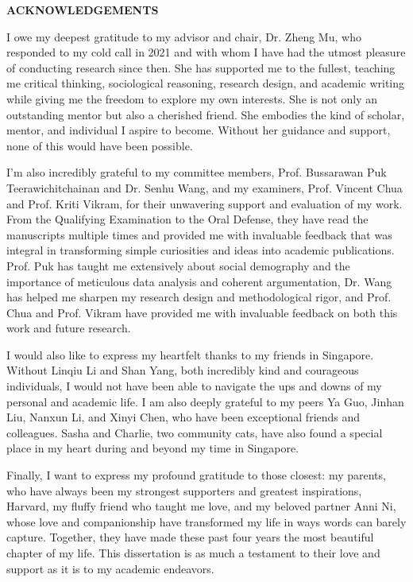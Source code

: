 \begin{center}
    {\large \textbf{ACKNOWLEDGEMENTS}}
\end{center}

\thispagestyle{plain}

I owe my deepest gratitude to my advisor and chair, Dr. Zheng Mu, who responded to my cold call in 2021 and with whom I have had the utmost pleasure of conducting research since then. She has supported me to the fullest, teaching me critical thinking, sociological reasoning, research design, and academic writing while giving me the freedom to explore my own interests. She is not only an outstanding mentor but also a cherished friend. She embodies the kind of scholar, mentor, and individual I aspire to become. Without her guidance and support, none of this would have been possible.

I'm also incredibly grateful to my committee members, Prof. Bussarawan Puk Teerawichitchainan and Dr. Senhu Wang, and my examiners, Prof. Vincent Chua and Prof. Kriti Vikram, for their unwavering support and evaluation of my work. From the Qualifying Examination to the Oral Defense, they have read the manuscripts multiple times and provided me with invaluable feedback that was integral in transforming simple curiosities and ideas into academic publications. Prof. Puk has taught me extensively about social demography and the importance of meticulous data analysis and coherent argumentation, Dr. Wang has helped me sharpen my research design and methodological rigor, and Prof. Chua and Prof. Vikram have provided me with invaluable feedback on both this work and future research.

I would also like to express my heartfelt thanks to my friends in Singapore. Without Linqiu Li and Shan Yang, both incredibly kind and courageous individuals, I would not have been able to navigate the ups and downs of my personal and academic life. I am also deeply grateful to my peers Ya Guo, Jinhan Liu, Nanxun Li, and Xinyi Chen, who have been exceptional friends and colleagues. Sasha and Charlie, two community cats, have also found a special place in my heart during and beyond my time in Singapore.

Finally, I want to express my profound gratitude to those closest: my parents, who have always been my strongest supporters and greatest inspirations, Harvard, my fluffy friend who taught me love, and my beloved partner Anni Ni, whose love and companionship have transformed my life in ways words can barely capture. Together, they have made these past four years the most beautiful chapter of my life. This dissertation is as much a testament to their love and support as it is to my academic endeavors.

\clearpage